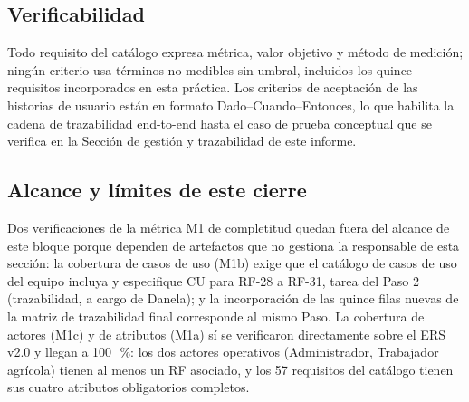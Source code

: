 \subsection{Verificabilidad}

Todo requisito del catálogo expresa métrica, valor objetivo y método de medición; ningún criterio usa términos no medibles sin umbral, incluidos los quince requisitos incorporados en esta práctica. Los criterios de aceptación de las historias de usuario están en formato Dado--Cuando--Entonces, lo que habilita la cadena de trazabilidad end-to-end hasta el caso de prueba conceptual que se verifica en la Sección de gestión y trazabilidad de este informe.

\subsection{Alcance y límites de este cierre}

Dos verificaciones de la métrica M1 de completitud quedan fuera del alcance de este bloque porque dependen de artefactos que no gestiona la responsable de esta sección: la cobertura de casos de uso (M1b) exige que el catálogo de casos de uso del equipo incluya y especifique CU para RF-28 a RF-31, tarea del Paso 2 (trazabilidad, a cargo de Danela); y la incorporación de las quince filas nuevas de la matriz de trazabilidad final corresponde al mismo Paso. La cobertura de actores (M1c) y de atributos (M1a) sí se verificaron directamente sobre el ERS v2.0 y llegan a 100~\,\%: los dos actores operativos (Administrador, Trabajador agrícola) tienen al menos un RF asociado, y los 57 requisitos del catálogo tienen sus cuatro atributos obligatorios completos.
